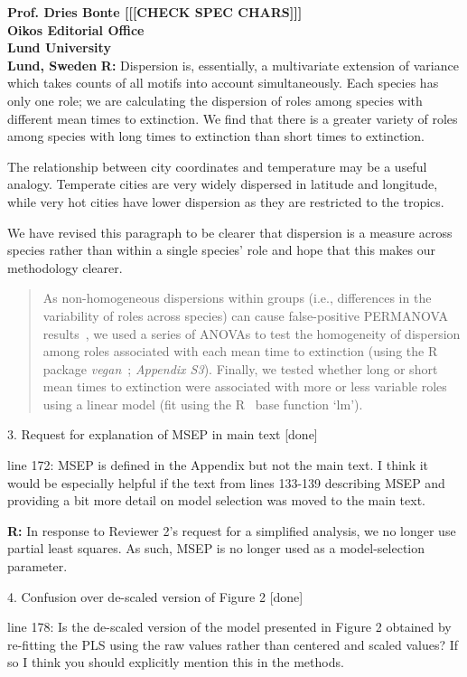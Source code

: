 \documentclass[12pt]{letter}
\begin{document}
\begin{letter}{\bf Prof. Dries Bonte [[[CHECK SPEC CHARS]]]\\
Oikos Editorial Office \\
Lund University \\
Lund, Sweden}
    \textbf{R:} Dispersion is, essentially, a multivariate extension of variance which takes counts of all motifs into account simultaneously. 
    Each species has only one role; we are calculating the dispersion of roles among species with different mean times to extinction. We find that there is a greater variety of roles among species with long times to extinction than short times to extinction. 


    The relationship between city coordinates and temperature may be a useful analogy. Temperate cities are very widely dispersed in latitude and longitude, while very hot cities have lower dispersion as they are restricted to the tropics.


    We have revised this paragraph to be clearer that dispersion is a measure across species rather than within a single species' role and hope that this makes our methodology clearer.


    \begin{quotation}

            As non-homogeneous dispersions within groups (i.e., differences in the variability of roles across species) can cause false-positive PERMANOVA results~\citep{Anderson2001}, we used a series of ANOVAs to test the homogeneity of dispersion among roles associated with each mean time to extinction (using the R~\citep{R} package \emph{vegan}~\citep{vegan}; \emph{Appendix S3}).
            Finally, we tested whether long or short mean times to extinction were associated with more or less variable roles  using a linear model (fit using the R~\citep{R} base function `lm').

    \end{quotation}    


  3. Request for explanation of MSEP in main text [done]

    line 172: MSEP is defined in the Appendix but not the main text. I think it would be especially helpful if the text from lines 133-139 describing MSEP and providing a bit more detail on model selection was moved to the main text.

    \textbf{R:} In response to Reviewer 2's request for a simplified analysis, we no longer use partial least squares. As such, MSEP is no longer used as a model-selection parameter.


  4. Confusion over de-scaled version of Figure 2 [done]

    line 178: Is the de-scaled version of the model presented in Figure 2 obtained by re-fitting the PLS using the raw values rather than centered and scaled values? If so I think you should explicitly mention this in the methods.   



\end{letter}
\end{document}
